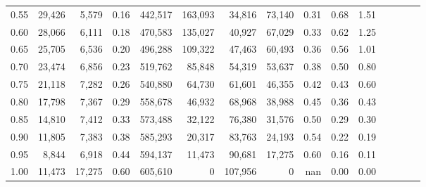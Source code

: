 \begin{tabular}{rrrcrrrrrrrrrrr}
0.55 &  29,426 &   5,579 &                                       0.16 &  442,517 &  163,093 &   34,816 &   73,140 &  0.31 &  0.68 &                         1.51 \\
0.60 &  28,066 &   6,111 &                                       0.18 &  470,583 &  135,027 &   40,927 &   67,029 &  0.33 &  0.62 &                         1.25 \\
0.65 &  25,705 &   6,536 &                                       0.20 &  496,288 &  109,322 &   47,463 &   60,493 &  0.36 &  0.56 &                         1.01 \\
0.70 &  23,474 &   6,856 &                                       0.23 &  519,762 &   85,848 &   54,319 &   53,637 &  0.38 &  0.50 &                         0.80 \\
0.75 &  21,118 &   7,282 &                                       0.26 &  540,880 &   64,730 &   61,601 &   46,355 &  0.42 &  0.43 &                         0.60 \\
0.80 &  17,798 &   7,367 &                                       0.29 &  558,678 &   46,932 &   68,968 &   38,988 &  0.45 &  0.36 &                         0.43 \\
0.85 &  14,810 &   7,412 &                                       0.33 &  573,488 &   32,122 &   76,380 &   31,576 &  0.50 &  0.29 &                         0.30 \\
0.90 &  11,805 &   7,383 &                                       0.38 &  585,293 &   20,317 &   83,763 &   24,193 &  0.54 &  0.22 &                         0.19 \\
0.95 &   8,844 &   6,918 &                                       0.44 &  594,137 &   11,473 &   90,681 &   17,275 &  0.60 &  0.16 &                         0.11 \\
1.00 &  11,473 &  17,275 &                                       0.60 &  605,610 &        0 &  107,956 &        0 &   nan &  0.00 &                         0.00 \\
\bottomrule
\end{tabular}
